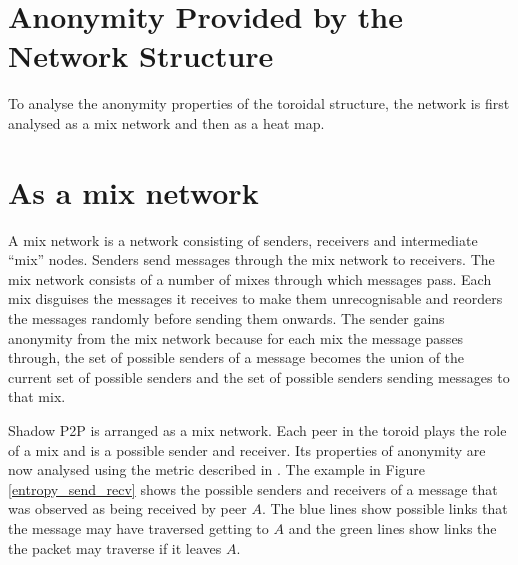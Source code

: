 \documentclass[ %
                    author={Luke Murray},
                supervisor={Dr. Simon Hollis},
                     title={Shadow Peer-to-Peer Networks},
                  subtitle={},
                    degree={MEng},
                      year={2013} ]{thesis}
\begin{document}
\section{Anonymity Provided by the Network Structure}

To analyse the anonymity properties of the toroidal structure, the network is first analysed as a mix network and then as a heat map.

\section{As a mix network}

A mix network is a network consisting of senders, receivers and intermediate ``mix'' nodes. Senders send messages through the mix network to receivers. The mix network consists of a number of mixes through which messages pass. Each mix disguises the messages it receives to make them unrecognisable and reorders the messages randomly before sending them onwards. The sender gains anonymity from the mix network because for each mix the message passes through, the set of possible senders of a message becomes the union of the current set of possible senders and the set of possible senders sending messages to that mix.

Shadow P2P is arranged as a mix network. Each peer in the toroid plays the role of a mix and is a possible sender and receiver. Its properties of anonymity are now analysed using the metric described in \cite{serjantov2003towards}. The example in Figure \ref{entropy_send_recv} shows the possible senders and receivers of a message that was observed as being received by peer $A$. The blue lines show possible links that the message may have traversed getting to $A$ and the green lines show links the the packet may traverse if it leaves $A$.
\end{document}
